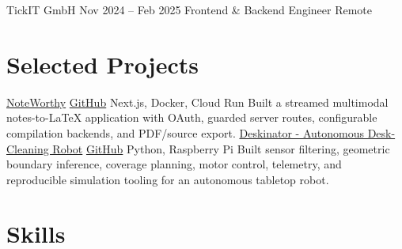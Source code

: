 \ResumeEntry
  {TickIT GmbH}
  {Nov 2024 -- Feb 2025}
  {Frontend \& Backend Engineer}
  {Remote}
\begin{ResumeItems}
\end{ResumeItems}

\section{Selected Projects}
\ProjectEntry
  {\href{https://noteworthy-giacomo-cappellettos-projects.vercel.app/}{NoteWorthy} \enspace\textbar\enspace \href{https://github.com/JJCAPPE/NoteWorthy}{GitHub}}
  {Next.js, Docker, Cloud Run}
  {Built a streamed multimodal notes-to-LaTeX application with OAuth, guarded server routes, configurable compilation backends, and PDF/source export.}
\ProjectEntry
  {\href{https://www.giacomocappelletto.com/projects/deskinator}{Deskinator - Autonomous Desk-Cleaning Robot} \enspace\textbar\enspace \href{https://github.com/JJCAPPE/deskinator}{GitHub}}
  {Python, Raspberry Pi}
  {Built sensor filtering, geometric boundary inference, coverage planning, motor control, telemetry, and reproducible simulation tooling for an autonomous tabletop robot.}

\AthleticsAwards

\section{Skills}
